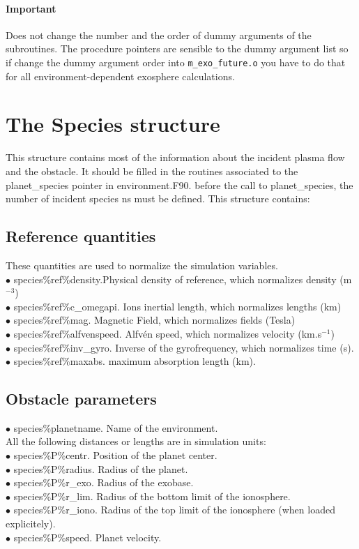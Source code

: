\documentclass{article}
\begin{document}
\paragraph{Important}
Does not change the number and the order of dummy arguments of the
subroutines. The procedure pointers are sensible to the dummy argument
list so if change the dummy argument order into {\tt m\_exo\_future.o}
you have to do that for all environment-dependent exosphere calculations.


\section{The Species structure}
This structure contains most of the information about the incident plasma flow and the obstacle. It should be filled in the routines associated to the {\sf planet\_species} pointer in {\sf environment.F90}. before the call to {\sf planet\_species}, the number of incident species {\sf ns} must be defined. This structure contains:

\subsection{Reference quantities}
These quantities are used to normalize the simulation variables.\\

$\bullet$ {\sf species\%ref\%density}.Physical density of reference, which normalizes density (m$^{-3}$)\\
$\bullet$ {\sf species\%ref\%c\_omegapi}. Ions inertial length, which normalizes lengths (km)\\
$\bullet$ {\sf species\%ref\%mag}. Magnetic Field, which normalizes fields (Tesla)\\
$\bullet$ {\sf species\%ref\%alfvenspeed}. Alfv\'en speed, which normalizes velocity (km.s$^{-1}$)\\
$\bullet$ {\sf species\%ref\%inv\_gyro}. Inverse of the gyrofrequency, which normalizes time (s).\\
$\bullet$ {\sf species\%ref\%maxabs}. maximum absorption length (km).\\

\subsection{Obstacle parameters}
$\bullet$ {\sf species\%planetname}. Name of the environment.\\
All the following distances or lengths are in simulation units:\\
$\bullet$ {\sf  species\%P\%centr}. Position of the planet center.\\
$\bullet$ {\sf  species\%P\%radius}. Radius of the planet.\\
$\bullet$ {\sf  species\%P\%r\_exo}. Radius of the exobase.\\
$\bullet$ {\sf  species\%P\%r\_lim}. Radius of the bottom limit of the ionosphere.\\
$\bullet$ {\sf  species\%P\%r\_iono}. Radius of the top limit of the ionosphere (when loaded explicitely).\\
$\bullet$ {\sf  species\%P\%speed}. Planet velocity.\\
\end{document}
